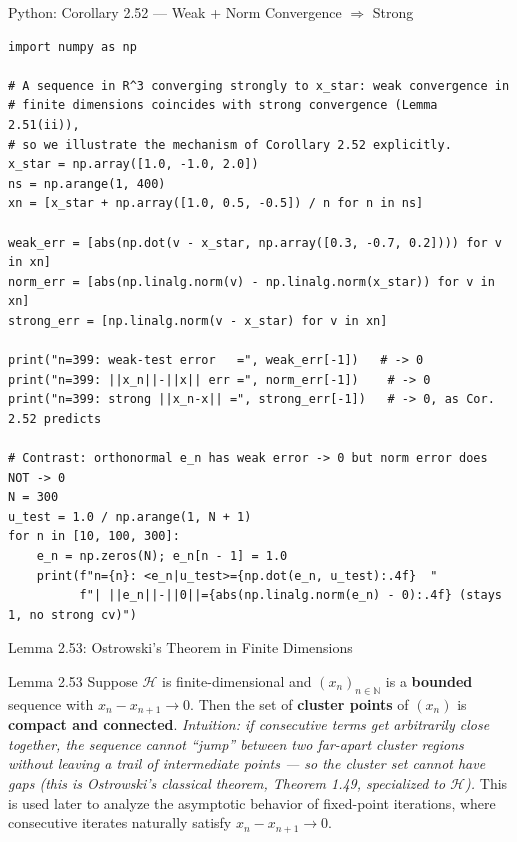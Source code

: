 \documentclass[aspectratio=169,10pt]{beamer}
\newcommand{\N}{\mathbb{N}}
\newcommand{\Hil}{\mathcal{H}}
\begin{document}
\begin{frame}[fragile]{Python: Corollary 2.52 --- Weak + Norm Convergence $\Rightarrow$ Strong}

\begin{lstlisting}[style=pycode]
import numpy as np

# A sequence in R^3 converging strongly to x_star: weak convergence in
# finite dimensions coincides with strong convergence (Lemma 2.51(ii)),
# so we illustrate the mechanism of Corollary 2.52 explicitly.
x_star = np.array([1.0, -1.0, 2.0])
ns = np.arange(1, 400)
xn = [x_star + np.array([1.0, 0.5, -0.5]) / n for n in ns]

weak_err = [abs(np.dot(v - x_star, np.array([0.3, -0.7, 0.2]))) for v in xn]
norm_err = [abs(np.linalg.norm(v) - np.linalg.norm(x_star)) for v in xn]
strong_err = [np.linalg.norm(v - x_star) for v in xn]

print("n=399: weak-test error   =", weak_err[-1])   # -> 0
print("n=399: ||x_n||-||x|| err =", norm_err[-1])    # -> 0
print("n=399: strong ||x_n-x|| =", strong_err[-1])   # -> 0, as Cor. 2.52 predicts

# Contrast: orthonormal e_n has weak error -> 0 but norm error does NOT -> 0
N = 300
u_test = 1.0 / np.arange(1, N + 1)
for n in [10, 100, 300]:
    e_n = np.zeros(N); e_n[n - 1] = 1.0
    print(f"n={n}: <e_n|u_test>={np.dot(e_n, u_test):.4f}  "
          f"| ||e_n||-||0||={abs(np.linalg.norm(e_n) - 0):.4f} (stays 1, no strong cv)")
\end{lstlisting}
\end{frame}

\begin{frame}{Lemma 2.53: Ostrowski's Theorem in Finite Dimensions}
  \begin{block}{Lemma 2.53}
    Suppose $\Hil$ is finite-dimensional and $(x_n)_{n\in\N}$ is a
    \textbf{bounded} sequence with $x_n - x_{n+1}\to 0$. Then the set of
    \textbf{cluster points} of $(x_n)$ is \textbf{compact and connected}.
    \textit{Intuition: if consecutive terms get arbitrarily close together,
    the sequence cannot ``jump'' between two far-apart cluster regions
    without leaving a trail of intermediate points --- so the cluster set
    cannot have gaps (this is Ostrowski's classical theorem, Theorem 1.49,
    specialized to $\Hil$).} This is used later to analyze the asymptotic
    behavior of fixed-point iterations, where consecutive iterates
    naturally satisfy $x_n-x_{n+1}\to 0$.
  \end{block}
\end{frame}
\end{document}
